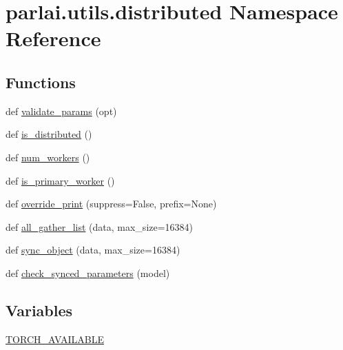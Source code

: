 \hypertarget{namespaceparlai_1_1utils_1_1distributed}{}\section{parlai.\+utils.\+distributed Namespace Reference}
\label{namespaceparlai_1_1utils_1_1distributed}
\subsection*{Functions}
\begin{DoxyCompactItemize}
\item 
def \hyperlink{namespaceparlai_1_1utils_1_1distributed_afd854992e4cc6571b120b9e179cd4a7a}{validate\+\_\+params} (opt)
\item 
def \hyperlink{namespaceparlai_1_1utils_1_1distributed_a023acb5e3b66e1f27e21247c35661279}{is\+\_\+distributed} ()
\item 
def \hyperlink{namespaceparlai_1_1utils_1_1distributed_a99b61b4756577c6542039c238d670dba}{num\+\_\+workers} ()
\item 
def \hyperlink{namespaceparlai_1_1utils_1_1distributed_a9bb1dac198180590ef8c6b6c6f9fc2c4}{is\+\_\+primary\+\_\+worker} ()
\item 
def \hyperlink{namespaceparlai_1_1utils_1_1distributed_a601345e55fc3fc3845c43efa1a04db56}{override\+\_\+print} (suppress=False, prefix=None)
\item 
def \hyperlink{namespaceparlai_1_1utils_1_1distributed_a9ef5bf0debf512ddbeb045327bfd87ef}{all\+\_\+gather\+\_\+list} (data, max\+\_\+size=16384)
\item 
def \hyperlink{namespaceparlai_1_1utils_1_1distributed_a269d3c7284127d9b287b9b61e9161de6}{sync\+\_\+object} (data, max\+\_\+size=16384)
\item 
def \hyperlink{namespaceparlai_1_1utils_1_1distributed_afc64140f9a6437dc1a2b2bd4294ba8ef}{check\+\_\+synced\+\_\+parameters} (model)
\end{DoxyCompactItemize}
\subsection*{Variables}
\begin{DoxyCompactItemize}
\item 
\hyperlink{namespaceparlai_1_1utils_1_1distributed_af99c57e9c67ff88f4802625436fc2c6c}{T\+O\+R\+C\+H\+\_\+\+A\+V\+A\+I\+L\+A\+B\+LE}
\end{DoxyCompactItemize}


